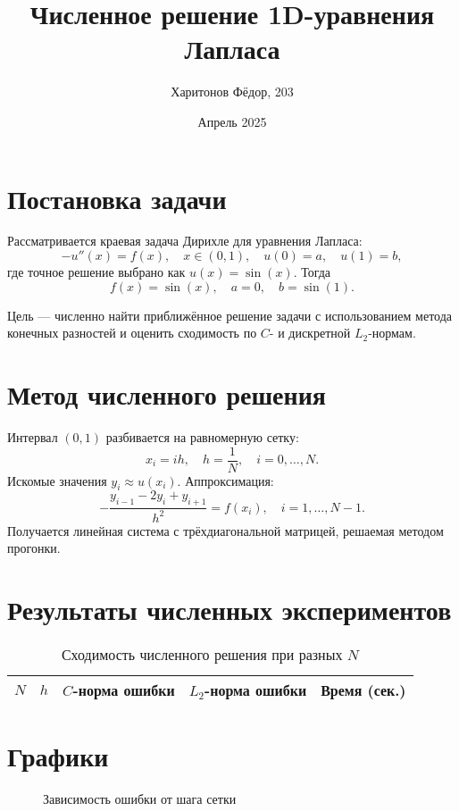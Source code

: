 \documentclass[a4paper,12pt]{article}
\title{Численное решение 1D-уравнения Лапласа}
\author{Харитонов Фёдор, 203}
\date{Апрель 2025}
\begin{document}
\maketitle

\section*{Постановка задачи}
Рассматривается краевая задача Дирихле для уравнения Лапласа:
\[ -u''(x) = f(x), \quad x \in (0,1), \quad u(0) = a, \quad u(1) = b, \]
где точное решение выбрано как \( u(x) = \sin(x) \). Тогда
\[ f(x) = \sin(x), \quad a = 0, \quad b = \sin(1). \]

Цель — численно найти приближённое решение задачи с использованием метода конечных разностей и оценить сходимость по \( C \)- и дискретной \( L_2 \)-нормам.

\section*{Метод численного решения}
Интервал \((0,1)\) разбивается на равномерную сетку:
\[ x_i = ih, \quad h = \frac{1}{N}, \quad i = 0, \dots, N. \]
Искомые значения \( y_i \approx u(x_i) \). Аппроксимация:
\[ -\frac{y_{i-1} - 2y_i + y_{i+1}}{h^2} = f(x_i), \quad i = 1, \dots, N-1. \]
Получается линейная система с трёхдиагональной матрицей, решаемая методом прогонки.

\section*{Результаты численных экспериментов}

\begin{table}[H]
\centering
\begin{tabular}{@{}ccccc@{}}
\toprule
$N$ & $h$ & $C$-норма ошибки & $L_2$-норма ошибки & Время (сек.) \\
\midrule

\bottomrule
\end{tabular}
\caption{Сходимость численного решения при разных $N$}
\end{table}

\section*{Графики}

\begin{figure}[H]
\centering
{}
\caption{Зависимость ошибки от шага сетки}
\end{figure}
\end{document}
